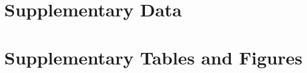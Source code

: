 \documentclass[utf8]{frontiers_suppmat} %
\begin{document}
    \onecolumn

    \title[Supplementary Material]{{}}


    \maketitle


    \section{Supplementary Data}

%


    \section{Supplementary Tables and Figures}

%

\end{document}
